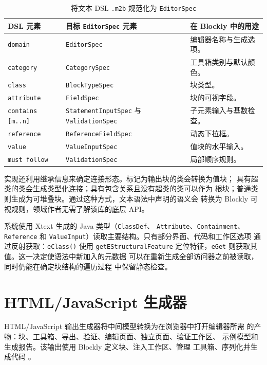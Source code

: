 \begin{table}[H]
  \centering
  \small
  \begin{tabular}{|L{0.30\textwidth}|L{0.30\textwidth}|L{0.26\textwidth}|}
    \hline
    DSL 元素 & 目标 \texttt{EditorSpec} 元素 & 在 Blockly 中的用途 \\
    \hline
    \texttt{domain} & \texttt{EditorSpec} & 编辑器名称与生成选项。 \\
    \texttt{category} & \texttt{CategorySpec} & 工具箱类别与默认颜色。 \\
    \texttt{class} & \texttt{BlockTypeSpec} & 块类型。 \\
    \texttt{attribute} & \texttt{FieldSpec} & 块的可视字段。 \\
    \texttt{contains [m..n]} & \texttt{StatementInputSpec} 与
    \texttt{ValidationSpec} & 子元素输入与基数检查。 \\
    \texttt{reference} & \texttt{ReferenceFieldSpec} & 动态下拉框。 \\
    \texttt{value} & \texttt{ValueInputSpec} & 值块的水平输入。 \\
    \texttt{must follow} & \texttt{ValidationSpec} & 局部顺序规则。 \\
    \hline
  \end{tabular}
  \caption{将文本 DSL \texttt{.m2b} 规范化为 \texttt{EditorSpec}}
  \label{tab:transformacion-dsl-editor-spec}
\end{table}

实现还利用继承信息来确定连接形态。标记为输出块的类会转换为值块；
具有超类的类会生成类型化连接；具有包含关系且没有超类的类可以作为
根块；普通类则生成为可堆叠块。通过这种方式，文本语法中声明的语义会
转换为 Blockly 可视规则，领域作者无需了解该库的底层 API。

系统使用 Xtext 生成的 Java 类型（\texttt{ClassDef}、
\texttt{Attribute}、\texttt{Containment}、\texttt{Reference} 和
\texttt{ValueInput}）读取主要结构。只有部分界面、代码和工作区选项
通过反射获取：\texttt{eClass()} 使用 \texttt{getEStructuralFeature}
定位特征，\texttt{eGet} 则获取其值。这一决定使语法中新加入的元数据
可以在重新生成全部访问器之前被读取，同时仍能在确定块结构的遍历过程
中保留静态检查。

\section{HTML/JavaScript 生成器}
\label{sec:implementacion-generador-html}

HTML/JavaScript 输出生成器将中间模型转换为在浏览器中打开编辑器所需
的产物：块、工具箱、导出、验证、编辑页面、独立页面、验证工作区、
示例模型和生成报告。该输出使用 Blockly 定义块、注入工作区、管理
工具箱、序列化并生成代码 \cite{blocklyDocs}。

